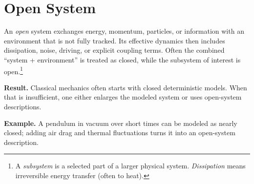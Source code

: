 \documentclass[11pt]{article}
\newcommand{\resultbox}[1]{%
  \begingroup\setlength{\fboxsep}{10pt}\noindent
  \colorbox{purple!8}{\parbox{\dimexpr\linewidth-2\fboxsep\relax}{\textbf{Result. }#1}}
  \endgroup
}
\newcommand{\examplebox}[1]{%
  \begingroup\setlength{\fboxsep}{10pt}\noindent
  \colorbox{green!8}{\parbox{\dimexpr\linewidth-2\fboxsep\relax}{\textbf{Example. }#1}}
  \endgroup
}
\begin{document}
\section*{Open System}
An \emph{open} system exchanges energy, momentum, particles, or information with
an environment that is not fully tracked. Its effective dynamics then includes
dissipation, noise, driving, or explicit coupling terms. Often the combined
``system + environment'' is treated as closed, while the subsystem of interest
is open.\footnote{A \emph{subsystem} is a selected part of a larger physical
system. \emph{Dissipation} means irreversible energy transfer (often to heat).}

\resultbox{Classical mechanics often starts with closed deterministic models.
When that is insufficient, one either enlarges the modeled system or uses
open-system descriptions.}

\examplebox{A pendulum in vacuum over short times can be modeled as nearly
closed; adding air drag and thermal fluctuations turns it into an open-system
description.}
\end{document}
